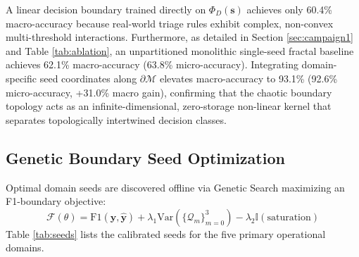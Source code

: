 \documentclass[10pt,journal,compsoc,twocolumn]{article}
\begin{document}
A linear decision boundary trained directly on $\Phi_D(\mathbf{s})$ achieves only 60.4\% macro-accuracy because real-world triage rules exhibit complex, non-convex multi-threshold interactions. Furthermore, as detailed in Section \ref{sec:campaign1} and Table \ref{tab:ablation}, an unpartitioned monolithic single-seed fractal baseline achieves 62.1\% macro-accuracy (63.8\% micro-accuracy). Integrating domain-specific seed coordinates along $\partial \mathcal{M}$ elevates macro-accuracy to 93.1\% (92.6\% micro-accuracy, +31.0\% macro gain), confirming that the chaotic boundary topology acts as an infinite-dimensional, zero-storage non-linear kernel that separates topologically intertwined decision classes.

\subsection{Genetic Boundary Seed Optimization}
Optimal domain seeds are discovered offline via Genetic Search maximizing an F1-boundary objective:
\begin{equation}
\mathcal{F}(\theta) = \text{F1}(\mathbf{y}, \hat{\mathbf{y}}) + \lambda_1 \text{Var}(\{\mathcal{Q}_m\}_{m=0}^3) - \lambda_2 \mathbb{I}(\text{saturation})
\end{equation}
Table \ref{tab:seeds} lists the calibrated seeds for the five primary operational domains.

\begin{table}[h]
\centering
\caption{Calibrated Domain Seeds on $\partial \mathcal{M}$ (24-Byte Footprint)}
\label{tab:seeds}
\end{table}
\end{document}
